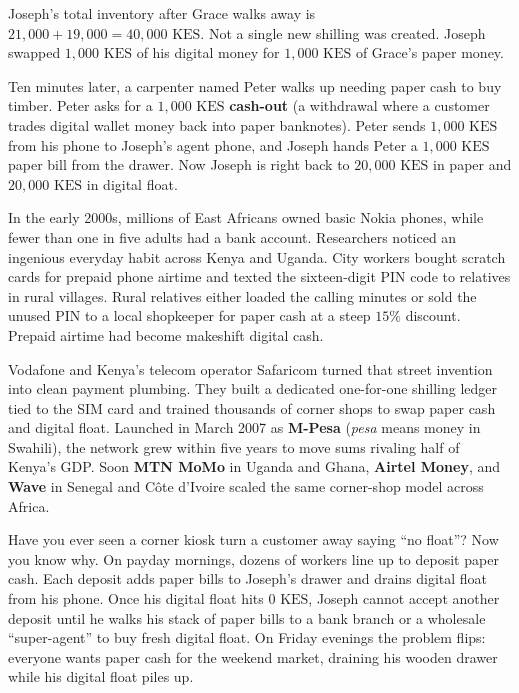 Joseph's total inventory after Grace walks away is $21{,}000 + 19{,}000 = 40{,}000\text{ KES}$. Not a single new shilling was created. Joseph swapped $1{,}000\text{ KES}$ of his digital money for $1{,}000\text{ KES}$ of Grace's paper money.

Ten minutes later, a carpenter named Peter walks up needing paper cash to buy timber. Peter asks for a $1{,}000\text{ KES}$ \textbf{cash-out} (a withdrawal where a customer trades digital wallet money back into paper banknotes). Peter sends $1{,}000\text{ KES}$ from his phone to Joseph's agent phone, and Joseph hands Peter a $1{,}000\text{ KES}$ paper bill from the drawer. Now Joseph is right back to $20{,}000\text{ KES}$ in paper and $20{,}000\text{ KES}$ in digital float.

\begin{historybox}
In the early 2000s, millions of East Africans owned basic Nokia phones, while fewer than one in five adults had a bank account. Researchers noticed an ingenious everyday habit across Kenya and Uganda. City workers bought scratch cards for prepaid phone airtime and texted the sixteen-digit PIN code to relatives in rural villages. Rural relatives either loaded the calling minutes or sold the unused PIN to a local shopkeeper for paper cash at a steep $15\%$ discount. Prepaid airtime had become makeshift digital cash.

Vodafone and Kenya's telecom operator Safaricom turned that street invention into clean payment plumbing. They built a dedicated one-for-one shilling ledger tied to the SIM card and trained thousands of corner shops to swap paper cash and digital float. Launched in March 2007 as \textbf{M-Pesa} (\emph{pesa} means money in Swahili), the network grew within five years to move sums rivaling half of Kenya's GDP. Soon \textbf{MTN MoMo} in Uganda and Ghana, \textbf{Airtel Money}, and \textbf{Wave} in Senegal and C\^{o}te d'Ivoire scaled the same corner-shop model across Africa.
\end{historybox}

\begin{happeningbox}
Have you ever seen a corner kiosk turn a customer away saying ``no float''? Now you know why. On payday mornings, dozens of workers line up to deposit paper cash. Each deposit adds paper bills to Joseph's drawer and drains digital float from his phone. Once his digital float hits $0\text{ KES}$, Joseph cannot accept another deposit until he walks his stack of paper bills to a bank branch or a wholesale ``super-agent'' to buy fresh digital float. On Friday evenings the problem flips: everyone wants paper cash for the weekend market, draining his wooden drawer while his digital float piles up.
\end{happeningbox}


